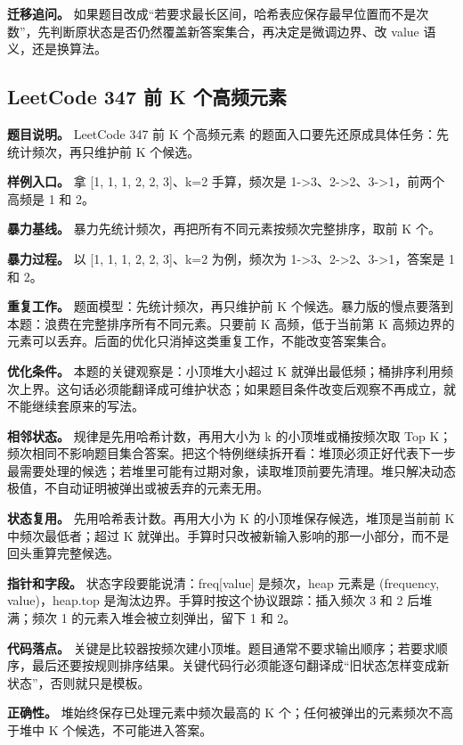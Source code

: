 \textbf{迁移追问。} 如果题目改成“若要求最长区间，哈希表应保存最早位置而不是次数”，先判断原状态是否仍然覆盖新答案集合，再决定是微调边界、改 value 语义，还是换算法。

\subsection{LeetCode 347 前 K 个高频元素}

\textbf{题目说明。} LeetCode 347 前 K 个高频元素 的题面入口要先还原成具体任务：先统计频次，再只维护前 K 个候选。

\textbf{样例入口。} 拿 [1, 1, 1, 2, 2, 3]、k=2 手算，频次是 1->3、2->2、3->1，前两个高频是 1 和 2。

\textbf{暴力基线。} 暴力先统计频次，再把所有不同元素按频次完整排序，取前 K 个。

\textbf{暴力过程。} 以 [1, 1, 1, 2, 2, 3]、k=2 为例，频次为 1->3、2->2、3->1，答案是 1 和 2。

\textbf{重复工作。} 题面模型：先统计频次，再只维护前 K 个候选。暴力版的慢点要落到本题：浪费在完整排序所有不同元素。只要前 K 高频，低于当前第 K 高频边界的元素可以丢弃。后面的优化只消掉这类重复工作，不能改变答案集合。

\textbf{优化条件。} 本题的关键观察是：小顶堆大小超过 K 就弹出最低频；桶排序利用频次上界。这句话必须能翻译成可维护状态；如果题目条件改变后观察不再成立，就不能继续套原来的写法。

\textbf{相邻状态。} 规律是先用哈希计数，再用大小为 k 的小顶堆或桶按频次取 Top K；频次相同不影响题目集合答案。把这个特例继续拆开看：堆顶必须正好代表下一步最需要处理的候选；若堆里可能有过期对象，读取堆顶前要先清理。堆只解决动态极值，不自动证明被弹出或被丢弃的元素无用。

\textbf{状态复用。} 先用哈希表计数。再用大小为 K 的小顶堆保存候选，堆顶是当前前 K 中频次最低者；超过 K 就弹出。手算时只改被新输入影响的那一小部分，而不是回头重算完整候选。

\textbf{指针和字段。} 状态字段要能说清：freq[value] 是频次，heap 元素是 (frequency, value)，heap.top 是淘汰边界。手算时按这个协议跟踪：插入频次 3 和 2 后堆满；频次 1 的元素入堆会被立刻弹出，留下 1 和 2。

\textbf{代码落点。} 关键是比较器按频次建小顶堆。题目通常不要求输出顺序；若要求顺序，最后还要按规则排序结果。关键代码行必须能逐句翻译成“旧状态怎样变成新状态”，否则就只是模板。

\textbf{正确性。} 堆始终保存已处理元素中频次最高的 K 个；任何被弹出的元素频次不高于堆中 K 个候选，不可能进入答案。

